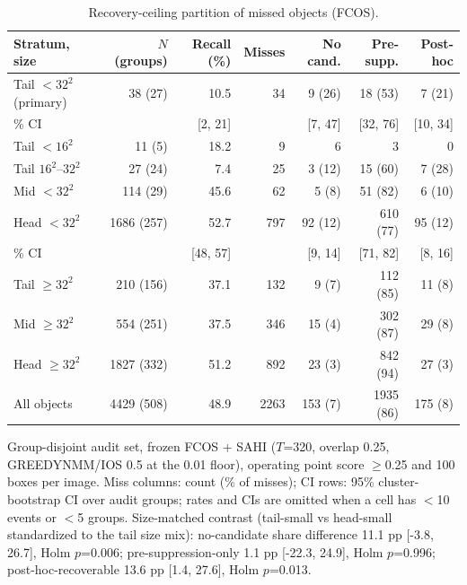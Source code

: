 \begin{table}[!htbp]
\centering
\footnotesize
\caption{Recovery-ceiling partition of missed objects (FCOS).}
\label{tab:partition-fcos}
\begin{tabular}{lrrrrrr}
\toprule
Stratum, size & $N$ (groups) & Recall (\%) & Misses & No cand. & Pre-supp. & Post-hoc \\
\midrule
Tail $<32^2$ (primary) & 38 (27) & 10.5 & 34 & 9 (26) & 18 (53) & 7 (21) \\
\quad 95\% CI & & [2, 21] & & [7, 47] & [32, 76] & [10, 34] \\
\quad Tail $<16^2$ & 11 (5) & 18.2 & 9 & 6 & 3 & 0 \\
\quad Tail $16^2$--$32^2$ & 27 (24) & 7.4 & 25 & 3 (12) & 15 (60) & 7 (28) \\
Mid $<32^2$ & 114 (29) & 45.6 & 62 & 5 (8) & 51 (82) & 6 (10) \\
Head $<32^2$ & 1686 (257) & 52.7 & 797 & 92 (12) & 610 (77) & 95 (12) \\
\quad 95\% CI & & [48, 57] & & [9, 14] & [71, 82] & [8, 16] \\
Tail $\geq 32^2$ & 210 (156) & 37.1 & 132 & 9 (7) & 112 (85) & 11 (8) \\
Mid $\geq 32^2$ & 554 (251) & 37.5 & 346 & 15 (4) & 302 (87) & 29 (8) \\
Head $\geq 32^2$ & 1827 (332) & 51.2 & 892 & 23 (3) & 842 (94) & 27 (3) \\
All objects & 4429 (508) & 48.9 & 2263 & 153 (7) & 1935 (86) & 175 (8) \\
\bottomrule
\end{tabular}
\par\smallskip\parbox{0.95\linewidth}{\footnotesize Group-disjoint audit set, frozen FCOS + SAHI ($T$=320, overlap 0.25, GREEDYNMM/IOS 0.5 at the 0.01 floor), operating point score $\geq$0.25 and 100 boxes per image. Miss columns: count (\% of misses); CI rows: 95\% cluster-bootstrap CI over audit groups; rates and CIs are omitted when a cell has $<$10 events or $<$5 groups. Size-matched contrast (tail-small vs head-small standardized to the tail size mix): no-candidate share difference 11.1 pp [-3.8, 26.7], Holm $p$=0.006; pre-suppression-only 1.1 pp [-22.3, 24.9], Holm $p$=0.996; post-hoc-recoverable 13.6 pp [1.4, 27.6], Holm $p$=0.013.}
\end{table}
